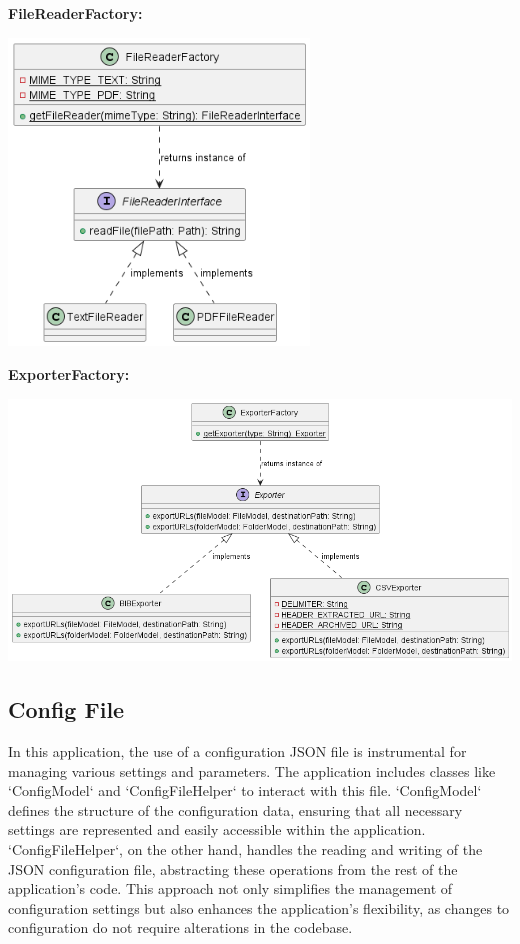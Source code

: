 \textbf{FileReaderFactory:} \\
\vskip 0.5cm
\begin{center}
    \includegraphics[width=0.6\textwidth]{pictures/FileReaderFactory-0.png}
\end{center}
\vskip 1cm
\textbf{ExporterFactory:} \\
\vskip 0.5cm
\begin{center}
    \includegraphics[width=1\textwidth]{pictures/ExporterFactory-0.png}
\end{center}

\subsection{Config File}
In this application, the use of a configuration JSON file is instrumental for managing various settings and parameters. The application includes classes like `ConfigModel` and `ConfigFileHelper` to interact with this file. `ConfigModel` defines the structure of the configuration data, ensuring that all necessary settings are represented and easily accessible within the application. `ConfigFileHelper`, on the other hand, handles the reading and writing of the JSON configuration file, abstracting these operations from the rest of the application's code. This approach not only simplifies the management of configuration settings but also enhances the application's flexibility, as changes to configuration do not require alterations in the codebase.

